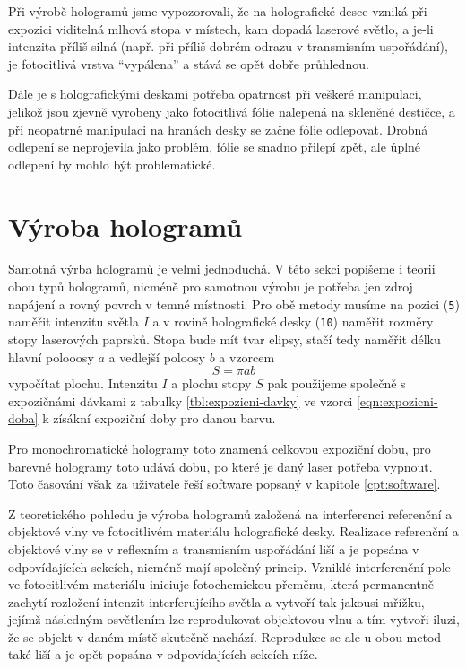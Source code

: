 \documentclass[twoside,project]{../MFFPrace}
\begin{document}
\medskip

Při výrobě hologramů jsme vypozorovali, že na holografické desce vzniká při expozici viditelná mlhová stopa v místech, kam dopadá laserové světlo, a je-li intenzita příliš silná (např. při příliš dobrém odrazu v transmisním uspořádání), je fotocitlivá vrstva "`vypálena"' a stává se opět dobře průhlednou.

Dále je s holografickými deskami potřeba opatrnost při veškeré manipulaci, jelikož jsou zjevně vyrobeny jako fotocitlivá fólie nalepená na skleněné destičce, a při neopatrné manipulaci na hranách desky se začne fólie odlepovat. Drobná odlepení se neprojevila jako problém, fólie se snadno přilepí zpět, ale úplné odlepení by mohlo být problematické.

\section{Výroba hologramů\label{sec:vyroba-hologramu}}
Samotná výrba hologramů je velmi jednoduchá. V této sekci popíšeme i teorii obou typů hologramů, nicméně pro samotnou výrobu je potřeba jen zdroj napájení a rovný povrch v temné místnosti. Pro obě metody musíme na pozici (\texttt{5}) naměřit intenzitu světla $I$ a v rovině holografické desky (\texttt{10}) naměřit rozměry stopy laserových paprsků. Stopa bude mít tvar elipsy, stačí tedy naměřit délku hlavní polooosy $a$ a vedlejší poloosy $b$ a vzorcem
\begin{equation}
    S=\pi a b
\end{equation}
vypočítat plochu. Intenzitu $I$ a plochu stopy $S$ pak použijeme společně s expozičnámi dávkami z tabulky \ref{tbl:expozicni-davky} ve vzorci \eqref{eqn:expozicni-doba} k zísákní expoziční doby pro danou barvu.

Pro monochromatické hologramy toto znamená celkovou expoziční dobu, pro barevné hologramy toto udává dobu, po které je daný laser potřeba vypnout. Toto časování však za uživatele řeší software popsaný v kapitole \ref{cpt:software}.

\medskip

Z teoretického pohledu je výroba hologramů založená na interferenci referenční a objektové vlny ve fotocitlivém materiálu holografické desky. Realizace referenční a objektové vlny se v reflexním a transmisním uspořádání liší a je popsána v odpovídajících sekcích, nicméně mají společný princip. Vzniklé interferenční pole ve fotocitlivém materiálu iniciuje fotochemickou přeměnu, která permanentně zachytí rozložení intenzit interferujícího světla a vytvoří tak jakousi mřížku, jejímž následným osvětlením lze reprodukovat objektovou vlnu a tím vytvoři iluzi, že se objekt v daném místě skutečně nachází. Reprodukce se ale u obou metod také liší a je opět popsána v odpovídajících sekcích níže.
\end{document}
